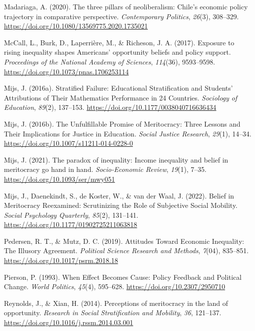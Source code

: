 \documentclass[
  12pt,
]{article}
\newlength{\cslhangindent}
\newenvironment{CSLReferences}[2] %
 {\begin{list}{}{%
  \setlength{\itemindent}{0pt}
  \setlength{\leftmargin}{0pt}
  \setlength{\parsep}{0pt}
  \ifodd #1
   \setlength{\leftmargin}{\cslhangindent}
   \setlength{\itemindent}{-1\cslhangindent}
  \fi
  \setlength{\itemsep}{#2\baselineskip}}}
 {\end{list}}
\begin{document}
\begin{CSLReferences}{1}{0}
Madariaga, A. (2020). The three pillars of neoliberalism: {Chile}'s
economic policy trajectory in comparative perspective.
\emph{Contemporary Politics}, \emph{26}(3), 308--329.
\url{https://doi.org/10.1080/13569775.2020.1735021}

McCall, L., Burk, D., Laperrière, M., \& Richeson, J. A. (2017).
Exposure to rising inequality shapes {Americans}' opportunity beliefs
and policy support. \emph{Proceedings of the National Academy of
Sciences}, \emph{114}(36), 9593--9598.
\url{https://doi.org/10.1073/pnas.1706253114}

Mijs, J. (2016a). Stratified {Failure}: {Educational Stratification} and
{Students}' {Attributions} of {Their Mathematics Performance} in 24
{Countries}. \emph{Sociology of Education}, \emph{89}(2), 137--153.
\url{https://doi.org/10.1177/0038040716636434}

Mijs, J. (2016b). The {Unfulfillable Promise} of {Meritocracy}: {Three
Lessons} and {Their Implications} for {Justice} in {Education}.
\emph{Social Justice Research}, \emph{29}(1), 14--34.
\url{https://doi.org/10.1007/s11211-014-0228-0}

Mijs, J. (2021). The paradox of inequality: Income inequality and belief
in meritocracy go hand in hand. \emph{Socio-Economic Review},
\emph{19}(1), 7--35. \url{https://doi.org/10.1093/ser/mwy051}

Mijs, J., Daenekindt, S., de Koster, W., \& van der Waal, J. (2022).
Belief in {Meritocracy Reexamined}: {Scrutinizing} the {Role} of
{Subjective Social Mobility}. \emph{Social Psychology Quarterly},
\emph{85}(2), 131--141. \url{https://doi.org/10.1177/01902725211063818}

Pedersen, R. T., \& Mutz, D. C. (2019). Attitudes {Toward Economic
Inequality}: {The Illusory Agreement}. \emph{Political Science Research
and Methods}, \emph{7}(04), 835--851.
\url{https://doi.org/10.1017/psrm.2018.18}

Pierson, P. (1993). When {Effect Becomes Cause}: {Policy Feedback} and
{Political Change}. \emph{World Politics}, \emph{45}(4), 595--628.
\url{https://doi.org/10.2307/2950710}

Reynolds, J., \& Xian, H. (2014). Perceptions of meritocracy in the land
of opportunity. \emph{Research in Social Stratification and Mobility},
\emph{36}, 121--137. \url{https://doi.org/10.1016/j.rssm.2014.03.001}


\end{CSLReferences}
\end{document}
